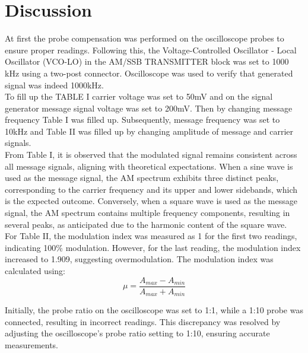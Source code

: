\newpage
\section*{Discussion}
At first the probe compensation was performed on the oscilloscope probes to ensure proper readings. Following this, the Voltage-Controlled Oscillator - Local Oscillator (VCO-LO) in the AM/SSB TRANSMITTER block was set to 1000 kHz using a two-post connector. Oscilloscope was used to verify that generated signal was indeed 1000kHz. \\

To fill up the TABLE I carrier voltage was set to 50mV and on the signal generator message signal voltage was set to 200mV. Then by changing message frequency Table I was filled up. Subsequently, message frequency was set to 10kHz and Table II was filled up by changing amplitude of message and carrier signals. \\

From Table I, it is observed that the modulated signal remains consistent across all message signals, aligning with theoretical expectations. When a sine wave is used as the message signal, the AM spectrum exhibits three distinct peaks, corresponding to the carrier frequency and its upper and lower sidebands, which is the expected outcome. Conversely, when a square wave is used as the message signal, the AM spectrum contains multiple frequency components, resulting in several peaks, as anticipated due to the harmonic content of the square wave.\\

For Table II, the modulation index was measured as 1 for the first two readings, indicating 100\% modulation. However, for the last reading, the modulation index increased to 1.909, suggesting overmodulation. The modulation index was calculated using: 
\[
    \mu = \frac{A_{max} - A_{min}}{A_{max} + A_{min}}
\]

Initially, the probe ratio on the oscilloscope was set to 1:1, while a 1:10 probe was connected, resulting in incorrect readings. This discrepancy was resolved by adjusting the oscilloscope's probe ratio setting to 1:10, ensuring accurate measurements.

